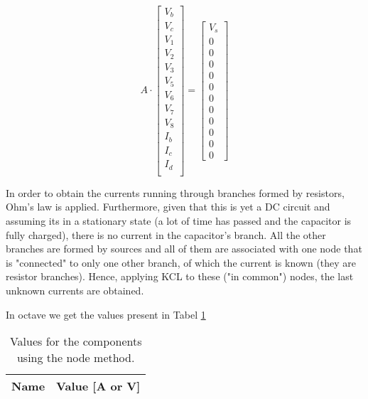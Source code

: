 \begin{equation}
    A \cdot
  \begin{bmatrix}
    V_b\\
    V_c\\
    V_1\\
    V_2\\
    V_3\\
    V_5\\
    V_6\\
    V_7\\
    V_8\\
    I_b\\
    I_c\\
    I_d\\
  \end{bmatrix}
    =
  \begin{bmatrix}
    V_s\\0\\0\\0\\0\\0\\0\\0\\0\\0\\0\\0
  \end{bmatrix}
  \label{eq:nodal_matrix_syst}
\end{equation}


In order to obtain the currents running through branches formed by resistors, Ohm's law is applied. Furthermore, given that this is yet a DC circuit and assuming its in a stationary state (a lot of time has passed and the capacitor is fully charged), there is no current in the capacitor's branch. All the other branches are formed by sources and all of them are associated with one node that is "connected" to only one other branch, of which the current is known (they are resistor branches). Hence, applying KCL to these ("in common") nodes, the last unknown currents are obtained.

In octave we get the values present in Tabel \ref{tab:op}


\begin{table}[h]
  \centering
  \begin{tabular}{|l|r|}
    \hline    
    {\bf Name} & {\bf Value [A or V]} \\ \hline
    
  \end{tabular}
  \caption{Values for the components using the node method.}
  \label{tab:op}
\end{table}



